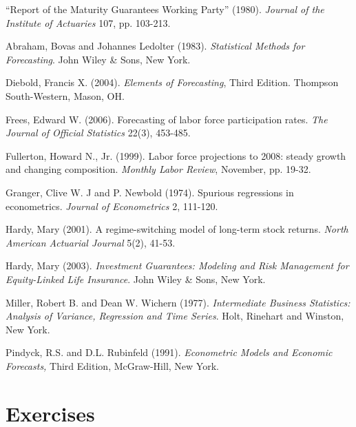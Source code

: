 \begin{multicols}{2}



``Report of the Maturity Guarantees Working Party'' (1980).
\textit{Journal of the Institute of Actuaries} 107, pp. 103-213.

Abraham, Bovas and  Johannes Ledolter (1983). \textit{Statistical
Methods for Forecasting}. John Wiley \& Sons, New York.

Diebold, Francis X. (2004). \textit{Elements of Forecasting}, Third
Edition. Thompson South-Western, Mason, OH.

Frees, Edward W. (2006). Forecasting of labor force participation
rates. \emph{The Journal of Official Statistics} 22(3), 453-485.

Fullerton, Howard N., Jr. (1999). Labor force projections to 2008:
steady growth and changing composition. \textit{Monthly Labor
Review}, November, pp. 19-32.

Granger, Clive W. J and P. Newbold (1974). Spurious regressions in
econometrics. \textit{Journal of Econometrics} 2, 111-120.

Hardy, Mary (2001). A regime-switching model of long-term stock
returns. \emph{North American Actuarial Journal} 5(2), 41-53.

Hardy, Mary (2003). \emph{Investment Guarantees: Modeling and Risk
Management for Equity-Linked Life Insurance}. John Wiley \& Sons,
New York.

Miller, Robert B. and Dean W. Wichern (1977). \emph{Intermediate
Business Statistics: Analysis of Variance, Regression and Time
Series}. Holt, Rinehart and Winston, New York.

Pindyck, R.S. and D.L. Rubinfeld (1991). \textit{Econometric Models
and Economic Forecasts,} Third Edition, McGraw-Hill, New York.


\end{multicols}

\section{Exercises}

